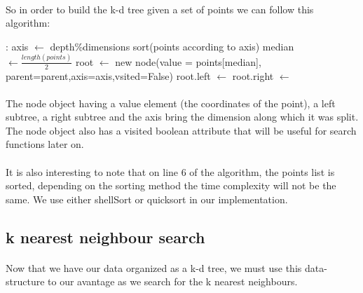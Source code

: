 \documentclass[11 pt]{article}
\begin{document}
\paragraph{}So in order to build the k-d tree given a set of points we can follow this algorithm:%
\begin{center}
\begin{algorithm}[H]

  :{
  \BlankLine
  \BlankLine
  \BlankLine
  \BlankLine
  axis $\leftarrow$ depth\%dimensions\;
  sort(points according to axis)\;
  median $\leftarrow \frac{length(points)}{2}$\;
  \BlankLine
  \BlankLine
  root $\leftarrow$ new node(value = points[median], parent=parent,axis=axis,vsited=False)\;
  root.left $\leftarrow$ \;
  root.right $\leftarrow$ \;
  \BlankLine
  \BlankLine
  \;
}
\end{algorithm}
\end{center}
\paragraph{}The node object having a value element (the coordinates of the point), a left subtree, a right subtree and the axis bring the dimension along which it was split. The node object also has a visited boolean attribute that will be useful for search functions later on.
\paragraph{}It is also interesting to note that on line $6$ of the algorithm, the points list is sorted, depending on the sorting method the time complexity will not be the same. We use either shellSort or quicksort in our implementation.

\subsection{k nearest neighbour search}
\paragraph{}Now that we have our data organized as a k-d tree, we must use this data-structure to our avantage as we search for the k nearest neighbours.
\end{document}
